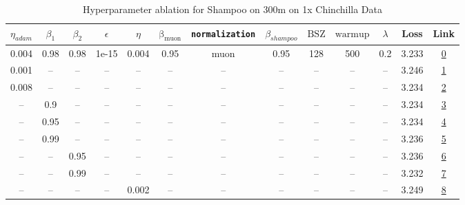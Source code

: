 \begin{table}[H]
\centering
\caption{Hyperparameter ablation for Shampoo on 300m on 1x Chinchilla Data}
\label{tab:ablation_shampoo_300m_1}
\begin{tabular}{ccccccccccccc}
\toprule
$\eta_{adam}$ & $\beta_1$ & $\beta_2$ & $\epsilon$ & $\eta$ & $\mathrm{\beta_{muon}}$ & \texttt{normalization} & $\beta_{shampoo}$ & $\mathrm{BSZ}$ & $\mathrm{warmup}$ & $\lambda$ & Loss & Link \\
\midrule
0.004 & 0.98 & 0.98 & 1e-15 & 0.004 & 0.95 & muon & 0.95 & 128 & 500 & 0.2 & 3.233 & \href{https://wandb.ai/stanford-mercury/optimizer-scaling/runs/sweep-300m-6B-mudamha48f33lr0.004-alr0.004-wd0.2-minlr0-warmup50-0f876a}{0} \\
\midrule
0.001 & -- & -- & -- & -- & -- & -- & -- & -- & -- & -- & 3.246 & \href{https://wandb.ai/stanford-mercury/optimizer-scaling/runs/sweep-300m-6B-mudamgb23e57lr0.004-alr0.001-wd0.2-minlr0-warmup50-149b67}{1} \\
0.008 & -- & -- & -- & -- & -- & -- & -- & -- & -- & -- & 3.234 & \href{https://wandb.ai/stanford-mercury/optimizer-scaling/runs/sweep-300m-6B-mudamgbb0beelr0.004-alr0.008-wd0.2-minlr0-warmup50-0f6ab3}{2} \\
-- & 0.9 & -- & -- & -- & -- & -- & -- & -- & -- & -- & 3.234 & \href{https://wandb.ai/stanford-mercury/optimizer-scaling/runs/sweep-300m-6B-mudamh5a62ealr0.004-alr0.004-wd0.2-minlr0-warmup50-a9d4fe}{3} \\
-- & 0.95 & -- & -- & -- & -- & -- & -- & -- & -- & -- & 3.234 & \href{https://wandb.ai/stanford-mercury/optimizer-scaling/runs/sweep-300m-6B-mudamh9aa795lr0.004-alr0.004-wd0.2-minlr0-warmup50-e78f66}{4} \\
-- & 0.99 & -- & -- & -- & -- & -- & -- & -- & -- & -- & 3.236 & \href{https://wandb.ai/stanford-mercury/optimizer-scaling/runs/sweep-300m-6B-mudamh981291lr0.004-alr0.004-wd0.2-minlr0-warmup50-fdab5b}{5} \\
-- & -- & 0.95 & -- & -- & -- & -- & -- & -- & -- & -- & 3.236 & \href{https://wandb.ai/stanford-mercury/optimizer-scaling/runs/sweep-300m-6B-mudamgeb2971lr0.004-alr0.004-wd0.2-minlr0-warmup50-b3e689}{6} \\
-- & -- & 0.99 & -- & -- & -- & -- & -- & -- & -- & -- & 3.232 & \href{https://wandb.ai/stanford-mercury/optimizer-scaling/runs/sweep-300m-6B-mudamg0d8c16lr0.004-alr0.004-wd0.2-minlr0-warmup50-330a0d}{7} \\
-- & -- & -- & -- & 0.002 & -- & -- & -- & -- & -- & -- & 3.249 & \href{https://wandb.ai/stanford-mercury/optimizer-scaling/runs/sweep-300m-6B-mudamg122c75lr0.002-alr0.004-wd0.2-minlr0-warmup50-c1eabd}{8} \\

\end{tabular}
\end{table}
